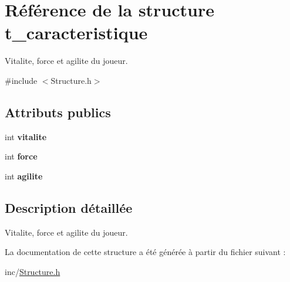 \hypertarget{structt__caracteristique}{}\section{Référence de la structure t\+\_\+caracteristique}
\label{structt__caracteristique}


Vitalite, force et agilite du joueur.  




{\ttfamily \#include $<$Structure.\+h$>$}

\subsection*{Attributs publics}
\begin{DoxyCompactItemize}
\item 
\hypertarget{structt__caracteristique_ac2f7da1e912076d87c0ab8838c2c2e00}{}int {\bfseries vitalite}\label{structt__caracteristique_ac2f7da1e912076d87c0ab8838c2c2e00}

\item 
\hypertarget{structt__caracteristique_aaef26944666deb471b8f65bd84681490}{}int {\bfseries force}\label{structt__caracteristique_aaef26944666deb471b8f65bd84681490}

\item 
\hypertarget{structt__caracteristique_acfe1e5e2bbbbdfee19e4a2ecc00d5b1a}{}int {\bfseries agilite}\label{structt__caracteristique_acfe1e5e2bbbbdfee19e4a2ecc00d5b1a}

\end{DoxyCompactItemize}


\subsection{Description détaillée}
Vitalite, force et agilite du joueur. 

La documentation de cette structure a été générée à partir du fichier suivant \+:\begin{DoxyCompactItemize}
\item 
inc/\hyperlink{Structure_8h}{Structure.\+h}\end{DoxyCompactItemize}
